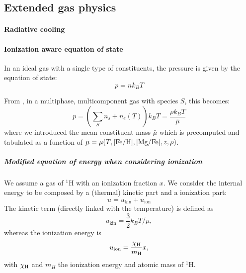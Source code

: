 \subsection{Extended gas physics}
\paragraph{Radiative cooling}

\paragraph{Ionization aware equation of state}
In an ideal gas with a single type of constituents, the pressure is given by the equation of state:
\begin{equation}
p = n k_B T
\end{equation}

From \citep[p. 161]{Vandenbroucke2016}, in a multiphase, multicomponent gas with species $S$, this becomes:
\begin{equation}
p = \left(\sum_S n_s + n_e(T)\right) k_BT =\frac{\rho k_B T}{\bar\mu}
\end{equation}
where we introduced the mean constituent mass $\bar\mu$ which is precomputed and tabulated as a function of $\bar\mu = \bar\mu(T, [\text{Fe}/\text{H}], [\text{Mg}/\text{Fe}], z, \rho)$.

\subparagraph{Modified equation of energy when considering ionization}
We assume a gas of ${}^1$H with an ionization fraction $x$.
We consider the internal energy to be composed by a (thermal) kinetic part and a ionization part:
\begin{equation}
\label{eq:u}
u = u_\text{kin} + u_\text{ion}
\end{equation}
The kinetic term (directly linked with the temperature) is defined as
\begin{equation}
u_\text{kin} = \frac 3 2 k_B T/ \mu, 
\end{equation}
whereas the ionization energy is
\begin{equation}
\label{eq:u_ion}
u_\text{ion} = \dfrac{\chi_\text H}{m_\text H} x,
\end{equation}
with $\chi_\text H$ and $m_H$ the ionization energy and atomic mass of ${}^1$H.

